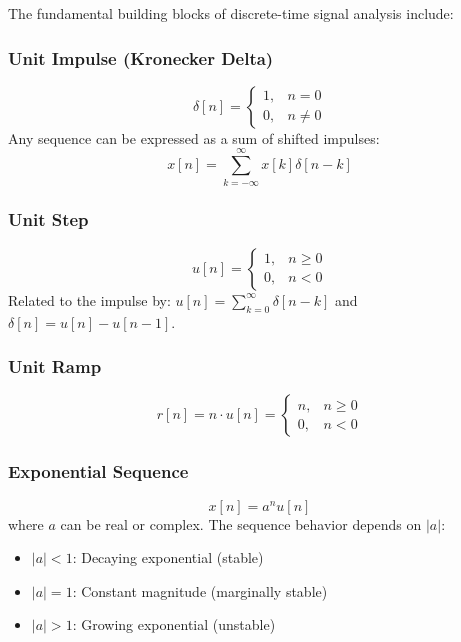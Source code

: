 

The fundamental building blocks of discrete-time signal analysis include:

\subsubsection{Unit Impulse (Kronecker Delta)}
\begin{equation}
\delta[n] = \begin{cases} 1, & n = 0 \\ 0, & n \neq 0 \end{cases}
\end{equation}
Any sequence can be expressed as a sum of shifted impulses:
\begin{equation}
x[n] = \sum_{k=-\infty}^{\infty} x[k] \delta[n-k]
\end{equation}

\subsubsection{Unit Step}
\begin{equation}
u[n] = \begin{cases} 1, & n \geq 0 \\ 0, & n < 0 \end{cases}
\end{equation}
Related to the impulse by: $u[n] = \sum_{k=0}^{\infty} \delta[n-k]$ and $\delta[n] = u[n] - u[n-1]$.

\subsubsection{Unit Ramp}
\begin{equation}
r[n] = n \cdot u[n] = \begin{cases} n, & n \geq 0 \\ 0, & n < 0 \end{cases}
\end{equation}

\subsubsection{Exponential Sequence}
\begin{equation}
x[n] = a^n u[n]
\end{equation}
where $a$ can be real or complex. The sequence behavior depends on $|a|$:
\begin{itemize}
    \item $|a| < 1$: Decaying exponential (stable)
    \item $|a| = 1$: Constant magnitude (marginally stable)
    \item $|a| > 1$: Growing exponential (unstable)
\end{itemize}

